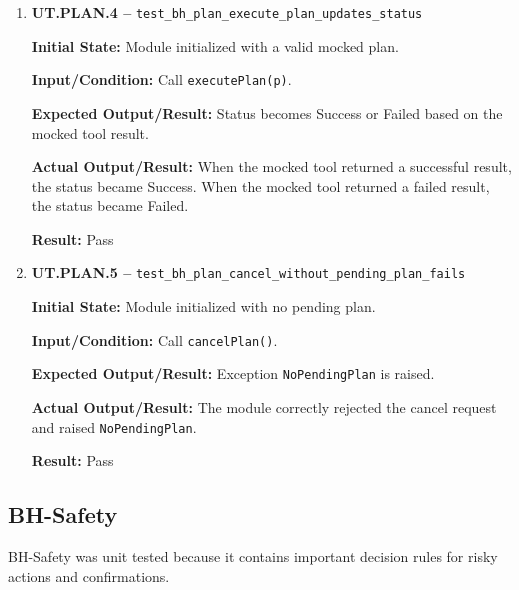 \documentclass[12pt]{article}
\begin{document}
\begin{enumerate}
    \textbf{Actual Output/Result:} The planner did not create an
    invalid plan and correctly raised \texttt{NoToolFound}.
    
    \textbf{Result:} Pass
    
    \item \textbf{UT.PLAN.4 --}
    \texttt{test\_bh\_plan\_execute\_plan\_updates\_status}
    
    \textbf{Initial State:} Module initialized with a valid mocked
    plan.
    
    \textbf{Input/Condition:} Call \texttt{executePlan(p)}.
    
    \textbf{Expected Output/Result:} Status becomes Success or Failed
    based on the mocked tool result.
    
    \textbf{Actual Output/Result:} When the mocked tool returned a
    successful result, the status became Success. When the mocked tool
    returned a failed result, the status became Failed.
    
    \textbf{Result:} Pass
    
    \item \textbf{UT.PLAN.5 --}
    \texttt{test\_bh\_plan\_cancel\_without\_pending\_plan\_fails}
    
    \textbf{Initial State:} Module initialized with no pending plan.
    
    \textbf{Input/Condition:} Call \texttt{cancelPlan()}.
    
    \textbf{Expected Output/Result:} Exception
    \texttt{NoPendingPlan} is raised.
    
    \textbf{Actual Output/Result:} The module correctly rejected the
    cancel request and raised \texttt{NoPendingPlan}.
    
    \textbf{Result:} Pass
\end{enumerate}

\subsection{BH-Safety}

BH-Safety was unit tested because it contains important decision rules
for risky actions and confirmations.
\end{document}
